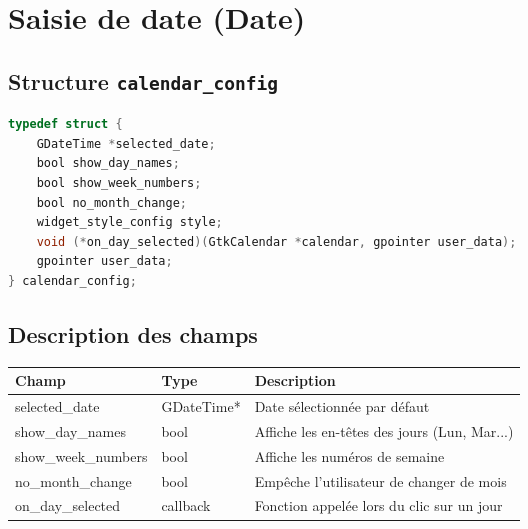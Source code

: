 \section{Saisie de date (Date)}

\subsection{Structure \texttt{calendar\_config}}
\begin{lstlisting}[language=C]
typedef struct {
    GDateTime *selected_date;
    bool show_day_names;
    bool show_week_numbers;
    bool no_month_change;
    widget_style_config style;
    void (*on_day_selected)(GtkCalendar *calendar, gpointer user_data);
    gpointer user_data;
} calendar_config;
\end{lstlisting}

\subsection{Description des champs}
\begin{center}
\begin{tabular}{|l|l|>{\raggedright\arraybackslash}p{6cm}|}
\hline
\textbf{Champ} & \textbf{Type} & \textbf{Description} \\
\hline
selected\_date & GDateTime* & Date sélectionnée par défaut \\
\hline
show\_day\_names & bool & Affiche les en-têtes des jours (Lun, Mar...) \\
\hline
show\_week\_numbers & bool & Affiche les numéros de semaine \\
\hline
no\_month\_change & bool & Empêche l'utilisateur de changer de mois \\
\hline
on\_day\_selected & callback & Fonction appelée lors du clic sur un jour \\
\hline
\end{tabular}
\end{center}